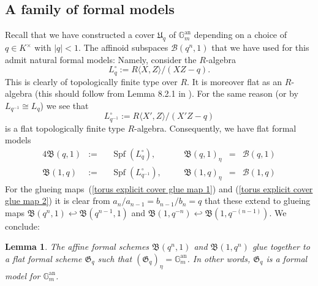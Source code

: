 \documentclass[11pt,oneside]{amsart}
\newtheorem{lemma}[theorem]{Lemma}
\theoremstyle{definition}
\theoremstyle{remark}
\begin{document}
	\subsection{A family of formal models}
	Recall that we have constructed a cover $\mathfrak U_q$ of $\mathbb G_m^{\operatorname{an}}$ depending on a choice of $q\in K^\times$ with $|q|<1$. The affinoid subspaces $\mathcal B(q^n,1)$ that we have used for this admit natural formal models: Namely, consider the $R$-algebra
	\[L_q^\circ := R\langle X,Z\rangle/(XZ-q).\]
	This is clearly of topologically finite type over $R$. It is moreover flat as an $R$-algebra (this should follow from Lemma 8.2.1 in \cite{Bosch lectures}). For the same reason (or by $L_{q^{-1}} \cong L_q$) we see that \[L_{q^{-1}}^\circ := R\langle X',Z\rangle/(X'Z-q)\] is a flat topologically finite type $R$-algebra. Consequently, we have flat formal models 
	\begin{alignat*}{4}
		\mathfrak B(q,1)&:=&& \operatorname{Spf}(L_{q}^\circ), &\quad&\mathfrak B(q,1)_\eta &=& \mathcal B(q,1)\\ 
		\mathfrak B(1,q)&:=&& \operatorname{Spf}(L_{q^{-1}}^\circ), &\quad&\mathfrak  B(1,q)_\eta &=& \mathcal B(1,q)
	\end{alignat*}
	For the glueing maps~(\ref{torus explicit cover glue map 1}) and (\ref{torus explicit cover glue map 2}) it is clear from $a_n/a_{n-1} = b_{n-1}/b_n = q$ that these extend to glueing maps $\mathfrak B(q^n,1)\hookleftarrow \mathfrak B(q^{n-1},1)$ and $\mathfrak B(1,q^{-n})\hookleftarrow \mathfrak B(1,q^{-(n-1)})$. We conclude:

	\begin{lemma}\label{formal model of torus}
		The affine formal schemes $\mathfrak B(q^n,1)$ and $\mathfrak B(1,q^n)$ glue together to a flat formal scheme $\mathfrak G_q$ such that $(\mathfrak G_q)_\eta = \mathbb G_m^{\operatorname{an}}$. In other words, $\mathfrak G_q$ is a formal model for $\mathbb G_m^{\operatorname{an}}$.
	\end{lemma}
\end{document}
